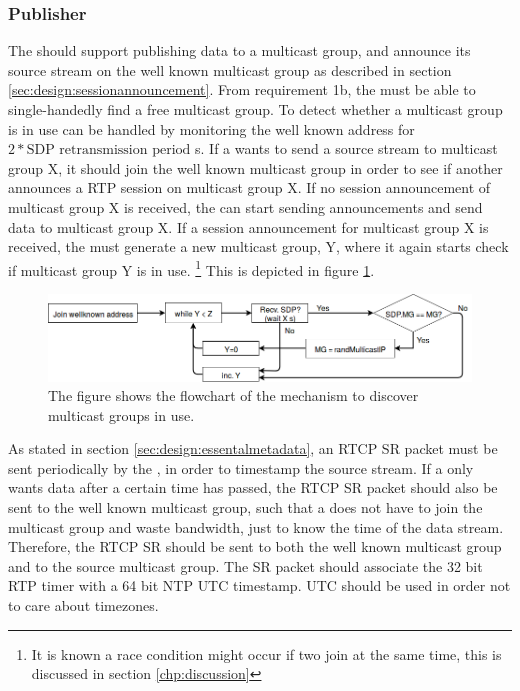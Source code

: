 \subsubsection{Publisher} \label{sec:design:publisher}
The \pub{} should support publishing data to a multicast group, and announce its source stream on the well known multicast group as described in section \ref{sec:design:sessionannouncement}.
From requirement 1b, the \pub{} must be able to single-handedly find a free multicast group. To detect whether a multicast group is in use can be handled by monitoring the well known address for $2*\text{SDP retransmission period}$ s. If a  wants to send a source stream to multicast group X, it should join the well known multicast group in order to see if another  announces a RTP session on multicast group X. If no session announcement of multicast group X is received, the  can start sending announcements and send data to multicast group X. If a session announcement for multicast group X is received, the  must generate a new multicast group, Y, where it again starts check if multicast group Y is in use. \footnote{It is known a race condition might occur if two \pubs{} join at the same time, this is discussed in section \ref{chp:discussion}} This is depicted in figure \ref{fig:design:pubsub:inuse}.

\begin{figure}[H]
	\centering
	\includegraphics[width=\textwidth]{figures/flowchart-publisher-mg}
	\caption{The figure shows the flowchart of the mechanism to discover multicast groups in use.} \label{fig:design:pubsub:inuse}
\end{figure}

As stated in section \ref{sec:design:essentalmetadata}, an RTCP SR packet must be sent periodically by the \pub{}, in order to timestamp the source stream. If a \sub{} only wants data after a certain time has passed, the RTCP SR packet should also be sent to the well known multicast group, such that a \sub{} does not have to join the multicast group and waste bandwidth, just to know the time of the data stream. Therefore, the RTCP SR should be sent to both the well known multicast group and to the source multicast group.
The SR packet should associate the 32 bit RTP timer with a 64 bit NTP \ac{UTC} timestamp. \ac{UTC} should be used in order not to care about timezones.

